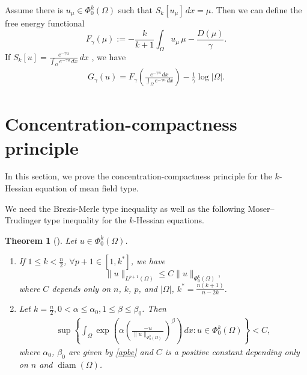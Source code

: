 \documentclass[11pt]{amsart}
\numberwithin{equation}{section}
\newtheorem{theorem}{Theorem}[section]
\numberwithin{equation}{section}
\begin{document}
Assume there is $u_{\mu}\in \Phi_0^k(\Omega)$ such that $S_k[u_{\mu}]\,dx=\mu$. Then we can define the free energy functional 
\[F_{\gamma}(\mu):=-\frac{k}{k+1}\int_\Omega u_{\mu}\,\mu-\frac{D(\mu)}{\gamma}.\]
If $S_k[u]=\frac{e^{-\gamma u}}{\int_{\Omega} e^{-\gamma u}\,dx}\,dx$ , we have
\begin{align}\label{F G eq}
G_{\gamma}(u)= F_{\gamma}\left(\frac{e^{-\gamma u}\,dx}{\int_\Omega e^{-\gamma u}\,dx}\right)-\frac{1}{\gamma}\log |\Omega|.
\end{align}

\vskip 20pt

\section{Concentration-compactness principle}\label{con-com}

In this section, we prove the concentration-compactness principle for the 
$k$-Hessian equation of mean field type. 

We need the Brezis-Merle type inequality as well as the following Moser--Trudinger type inequality for the 
$k$-Hessian equations.

\begin{theorem}[\cite{Wan94, Wan09}]\label{thm MT type inequality} Let $u \in \Phi_0^k(\Omega)$.
	\begin{enumerate}
		\item [(1)]  If $1\leq k<\frac{n}{2}$, $\forall p+1\in [1,k^*]$, we have
		\[\|u\|_{L^{p+1}(\Omega)}\leq C\|u\|_{\Phi_0^k(\Omega)},\]
		where $C$ depends only on $n$, $k$, $p$, and $|\Omega|$, $k^*=\frac{n(k+1)}{n-2k}$.
		
		\item [(2)] Let $k = \frac{n}{2}, 0<\alpha\le \alpha_0, 1\le \beta\le \beta_0$. Then
		\begin{align}\label{MT type inequality}
			\sup \left\{ \int_{\Omega} \exp \left( \alpha \left( \frac{-u}{\|u\|_{\Phi_0^k(\Omega)}} \right)^\beta \right) \,dx : u \in \Phi_0^k(\Omega) \right\} < C,
		\end{align}
		where $\alpha_0$, $\beta_0$ are given by \eqref{apbe} and $C$ is a positive constant depending only on $n$ and $\operatorname{diam}(\Omega)$.
	\end{enumerate}
	
\end{theorem}
\end{document}
